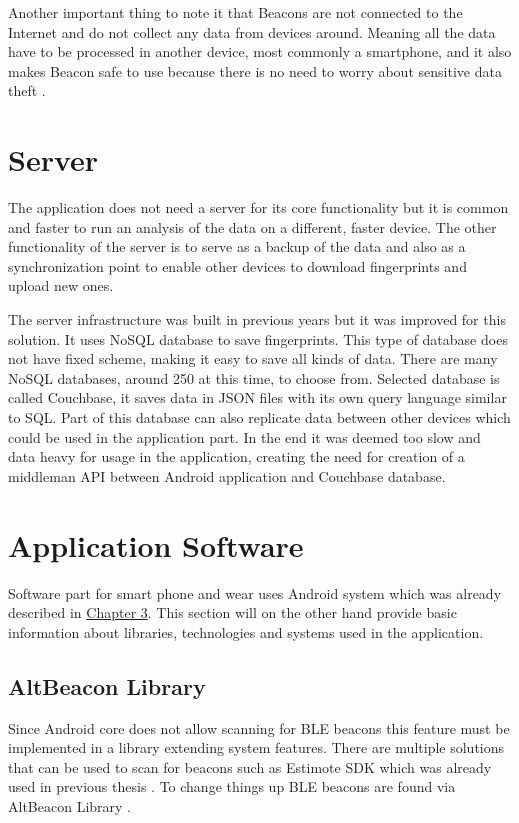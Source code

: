 Another important thing to note it that Beacons are not connected to the Internet and do not collect any data from devices around. Meaning all the data have to be processed in another device, most commonly a smartphone, and it also makes Beacon safe to use because there is no need to worry about sensitive data theft \cite{10TABB}.

\section{Server}\label{sec:Server}
The application does not need a server for its core functionality but it is common and faster to run an analysis of the data on a different, faster device. The other functionality of the server is to serve as a backup of the data and also as a synchronization point to enable other devices to download fingerprints and upload new ones.

The server infrastructure was built in previous years \cite{IILUBLEB} but it was improved for this solution. It uses NoSQL database to save fingerprints. This type of database does not have fixed scheme, making it easy to save all kinds of data. There are many NoSQL databases, around 250 at this time, to choose from. Selected database is called Couchbase, it saves data in JSON files with its own query language similar to SQL. Part of this database can also replicate data between other devices which could be used in the application part. In the end it was deemed too slow and data heavy for usage in the application, creating the need for creation of a middleman API between Android application and Couchbase database.


\section{Application Software}\label{sec:ApplicationSoftware}
Software part for smart phone and wear uses Android system which was already described in \hyperref[sec:Android]{Chapter 3}. This section will on the other hand provide basic information about libraries, technologies and systems used in the application.

\subsection{AltBeacon Library}\label{subsec:AltBeaconLibrary}
Since Android core does not allow scanning for BLE beacons this feature must be implemented in a library extending system features. There are multiple solutions that can be used to scan for beacons such as Estimote SDK \cite{ESDKfA} which was already used in previous thesis \cite{PMRIL}. To change things up BLE beacons are found via AltBeacon Library \cite{ABL}.

